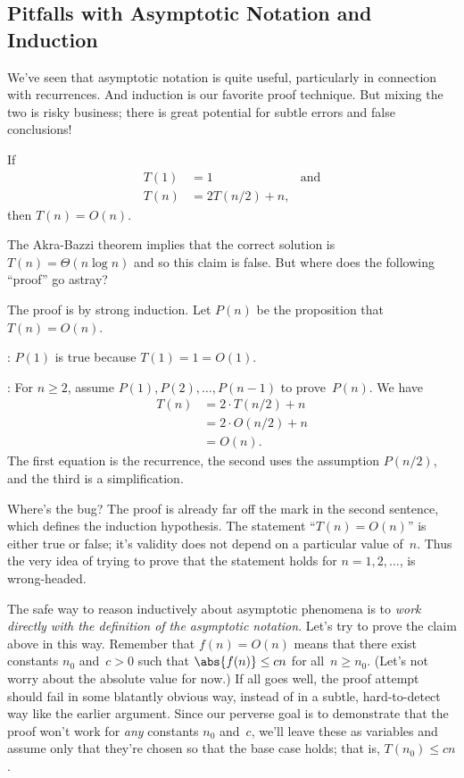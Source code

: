 \begin{editingnotes}
\subsection*{Pitfalls with Asymptotic Notation and Induction}

We've seen that asymptotic notation is quite useful, particularly in
connection with recurrences.  And induction is our favorite proof
technique.  But mixing the two  is risky business; there is great
potential for subtle errors and false conclusions!

\begin{falseclm*}
If
\begin{align*}
   T(1)   &= 1 & \text{and}\\
   T(n)   &= 2 T(n/2) + n,
\end{align*}
then $T(n) = O(n)$.
\end{falseclm*}

The Akra-Bazzi theorem implies that the correct solution is $T(n) =
\Theta(n \log n)$ and so this claim is false.  But where does the
following ``proof'' go astray?

\begin{bogusproof}
The proof is by strong induction.  Let $P(n)$ be the proposition that
$T(n) = O(n)$.

: $P(1)$ is true because $T(1) = 1 = O(1)$.

:
For $n \ge 2$, assume $P(1), P(2), \dots, P(n - 1)$ to
prove~$P(n)$.  We have
\begin{align*}
   T(n) &= 2 \cdot T(n/2) + n \\
        &= 2 \cdot O(n/2) + n \\
        &= O(n).
\end{align*}
The first equation is the recurrence, the second uses the assumption
$P(n/2)$, and the third is a simplification.
\end{bogusproof}

Where's the bug?  The proof is already far off the mark in the second
sentence, which defines the induction hypothesis.  The statement
``$T(n) = O(n)$'' is either true or false; it's validity does not
depend on a particular value of~$n$.  Thus the very idea of trying to
prove that the statement holds for $n = 1, 2, \dots$, is
wrong-headed.

The safe way to reason inductively about asymptotic phenomena is to
\emph{work directly with the definition of the asymptotic notation}.  Let's try
to prove the claim above in this way.  Remember that $f(n) = O(n)$
means that there exist constants $n_0$ and~$c > 0$ such that
$\abs{f(n)} \le cn$ for all~$n \ge n_0$.  (Let's not worry about the
absolute value for now.)  If all goes well, the proof attempt should
fail in some blatantly obvious way, instead of in a subtle,
hard-to-detect way like the earlier argument.  Since our perverse goal
is to demonstrate that the proof won't work for \emph{any} constants
$n_0$ and~$c$, we'll leave these as variables and assume only that
they're chosen so that the base case holds; that is, $T(n_0) \le cn$.


\end{editingnotes}
